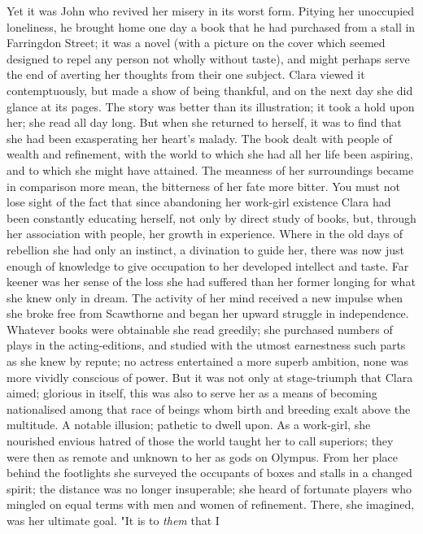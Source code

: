 Yet it was John who revived her misery in its worst form. Pitying her
unoccupied loneliness, he brought home one day a book that he had
purchased from a stall in Farringdon Street; it was a novel (with a
picture on the cover which seemed designed to repel any person not
wholly without taste), and might perhaps serve the end of averting her
thoughts {\protect\hypertarget{63}{}{}}from their one subject. Clara
viewed it contemptuously, but made a show of being thankful, and on the
next day she did glance at its pages. The story was better than its
illustration; it took a hold upon her; she read all day long. But when
she returned to herself, it was to find that she had been exasperating
her heart's malady. The book dealt with people of wealth and refinement,
with the world to which she had all her life been aspiring, and to which
she might have attained. The meanness of her surroundings became in
comparison more mean, the bitterness of her fate more bitter. You must
not lose sight of the fact that since abandoning her work-girl existence
Clara had been constantly educating herself, not only by direct study of
books, but, through her association with people, her growth in
experience. Where in the old days of rebellion she had only an instinct,
a divination to guide her, there was now just enough of knowledge to
give occupation to her developed intellect and taste. Far keener was her
sense of the loss she had suffered than her former longing for what she
knew only in dream. The activity of her mind received a new
{\protect\hypertarget{64}{}{}}impulse when she broke free from
Scawthorne and began her upward struggle in independence. Whatever books
were obtainable she read greedily; she purchased numbers of plays in the
acting-editions, and studied with the utmost earnestness such parts as
she knew by repute; no actress entertained a more superb ambition, none
was more vividly conscious of power. But it was not only at
stage-triumph that Clara aimed; glorious in itself, this was also to
serve her as a means of becoming nationalised among that race of beings
whom birth and breeding exalt above the multitude. A notable illusion;
pathetic to dwell upon. As a work-girl, she nourished envious hatred of
those the world taught her to call superiors; they were then as remote
and unknown to her as gods on Olympus. From her place behind the
footlights she surveyed the occupants of boxes and stalls in a changed
spirit; the distance was no longer insuperable; she heard of fortunate
players who mingled on equal terms with men and women of refinement.
There, she imagined, was her ultimate goal. "It is to \emph{them} that I
